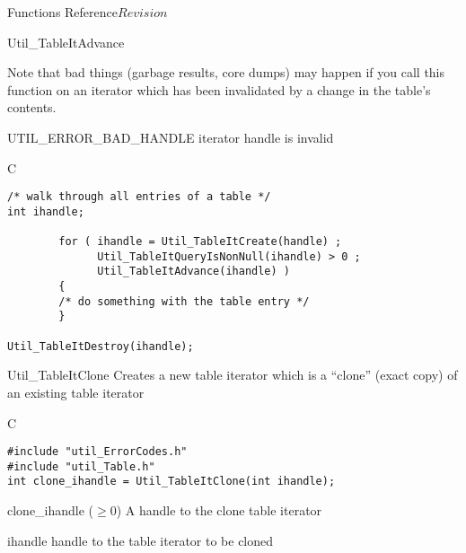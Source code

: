 \begin{cactuspart}{ Functions Reference}{}{$Revision$}
\begin{FunctionDescription}{Util\_TableItAdvance}
\begin{Discussion}
Note that bad things (garbage results, core dumps) may happen if
you call this function on an iterator which has been invalidated
by a change in the table's contents.
\end{Discussion}

\begin{ErrorSection}
\begin{Error}{UTIL\_ERROR\_BAD\_HANDLE}
iterator handle is invalid
\end{Error}
\end{ErrorSection}

\begin{ExampleSection}
\begin{Example}{C}
\begin{verbatim}
/* walk through all entries of a table */
int ihandle;

        for ( ihandle = Util_TableItCreate(handle) ;
              Util_TableItQueryIsNonNull(ihandle) > 0 ;
              Util_TableItAdvance(ihandle) )
        {
        /* do something with the table entry */
        }

Util_TableItDestroy(ihandle);
\end{verbatim}
\end{Example}
\end{ExampleSection}
\end{FunctionDescription}


\begin{FunctionDescription}{Util\_TableItClone}
\label{Util-TableItClone}
Creates a new table iterator which is a ``clone'' (exact copy) of an
existing table iterator

\begin{SynopsisSection}
\begin{Synopsis}{C}
\begin{verbatim}
#include "util_ErrorCodes.h"
#include "util_Table.h"
int clone_ihandle = Util_TableItClone(int ihandle);
\end{verbatim}
\end{Synopsis}
\end{SynopsisSection}

\begin{ResultSection}
\begin{Result}{clone\_ihandle ($\ge 0$)}
A handle to the clone table iterator
\end{Result}
\end{ResultSection}

\begin{ParameterSection}
\begin{Parameter}{ihandle}
handle to the table iterator to be cloned
\end{Parameter}
\end{ParameterSection}


\end{FunctionDescription}
\end{cactuspart}
